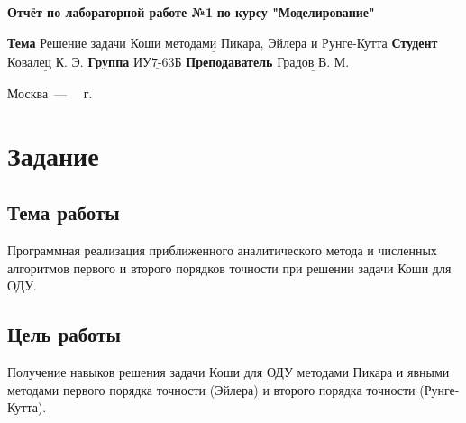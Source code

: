 \documentclass[a4paper,14pt, unknownkeysallowed]{extreport}
\begin{document}
\begin{titlepage}
	
	\begin{center}
		\noindent\begin{minipage}{1.3\textwidth}\centering
		\Large\textbf{Отчёт по лабораторной работе №1}\newline
		\textbf{по курсу "Моделирование"}\newline\newline\newline\newline\newline
		\end{minipage}
	\end{center}
	
	\noindent\textbf{Тема} 			$\underline{\text{Решение задачи Коши методами Пикара, Эйлера и Рунге-Кутта}}$\newline\newline
	\noindent\textbf{Студент} 		$\underline{\text{Ковалец К. Э.}}$\newline\newline
	\noindent\textbf{Группа} 		$\underline{\text{ИУ7-63Б}}$\newline\newline
	\noindent\textbf{Преподаватель} $\underline{\text{Градов В. М.}}$\newline
	
	\begin{center}
		\vfill
		Москва~---~\the\year
		~г.
	\end{center}
	\restoregeometry
\end{titlepage}



\setcounter{page}{2}

\chapter{Задание}

\section{Тема работы}

Программная реализация приближенного аналитического метода и численных алгоритмов первого и второго порядков точности при решении задачи Коши для ОДУ.

\section{Цель работы}

Получение навыков решения задачи Коши для ОДУ методами Пикара и явными методами первого порядка точности (Эйлера) и второго порядка точности (Рунге-Кутта).
\end{document}
